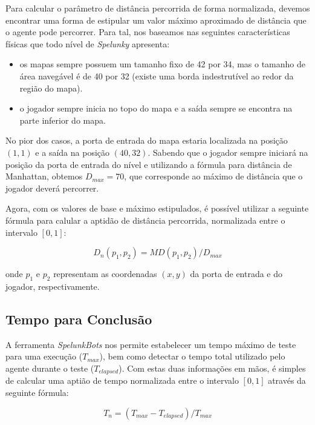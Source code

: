 Para calcular o parâmetro de distância percorrida de forma normalizada, devemos
encontrar uma forma de estipular um valor máximo aproximado de distância que o
agente pode percorrer. Para tal, nos baseamos nas seguintes características
físicas que todo nível de \textit{Spelunky} apresenta:

\begin{itemize}
	\item os mapas sempre possuem um tamanho fixo de 42 por 34, mas o tamanho de
		área navegável é de 40 por 32 (existe uma borda indestrutível ao redor
		da região do mapa).
	\item o jogador sempre inicia no topo do mapa e a saída sempre se encontra
		na parte inferior do mapa.
\end{itemize}

No pior dos casos, a porta de entrada do mapa estaria localizada na posição
$(1,1)$ e a saída na posição $(40,32)$. Sabendo que o jogador sempre iniciará na
posição da porta de entrada do nível e utilizando a fórmula para distância de
Manhattan, obtemos $D_{max} = 70$, que corresponde ao máximo de distância que o
jogador deverá percorrer.

Agora, com os valores de base e máximo estipulados, é possível utilizar a
seguinte fórmula para calular a aptidão de distância percorrida, normalizada
entre o intervalo $[0,1]$:

\begin{equation}
	\label{eq:distance-fitness}
	D_{n}(p_{1},p_{2}) = MD(p_{1},p_{2}) / D_{max}
\end{equation}

onde $p_1$ e $p_2$ representam as coordenadas $(x,y)$ da porta de entrada e do
jogador, respectivamente. 

\subsection{Tempo para Conclusão}
A ferramenta \textit{SpelunkBots} nos permite estabelecer um tempo máximo de
teste para uma execução ($T_{max}$), bem como detectar o tempo total utilizado
pelo agente durante o teste ($T_{elapsed}$). Com estas duas informações em mãos,
é simples de calcular uma aptião de tempo normalizada entre o intervalo $[0,1]$
através da seguinte fórmula:

\begin{equation}
	\label{eq:time-fitness-wrong}
	T_{n} = (T_{max} - T_{elapsed}) / T_{max}
\end{equation}


